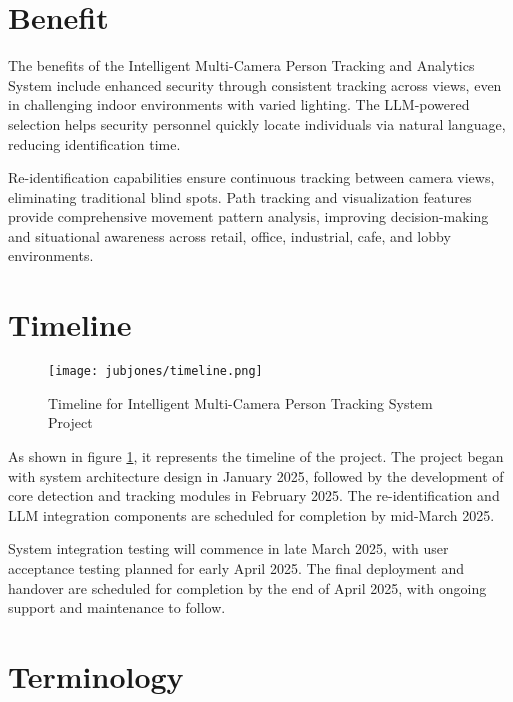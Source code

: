 \newpage

\section{Benefit}
\label{section:benefit}

The benefits of the Intelligent Multi-Camera Person Tracking and Analytics System include enhanced security through consistent tracking across views, even in challenging indoor environments with varied lighting. The LLM-powered selection helps security personnel quickly locate individuals via natural language, reducing identification time.

Re-identification capabilities ensure continuous tracking between camera views, eliminating traditional blind spots. Path tracking and visualization features provide comprehensive movement pattern analysis, improving decision-making and situational awareness across retail, office, industrial, cafe, and lobby environments.

\section{Timeline}
\label{section:timeline}

\begin{figure}[!htb]
    \centering
    \texttt{[image: jubjones/timeline.png]}
    \caption{Timeline for Intelligent Multi-Camera Person Tracking System Project}
    \label{fig:timeline}
\end{figure}

As shown in figure \ref{fig:timeline}, it represents the timeline of the project.
The project began with system architecture design in January 2025, followed by the development of core detection
and tracking modules in February 2025. The re-identification and LLM integration components are scheduled for
completion by mid-March 2025.

System integration testing will commence in late March 2025, with user acceptance testing planned for early April 2025.
The final deployment and handover are scheduled for completion by the end of April 2025, with ongoing support
and maintenance to follow.

\section{Terminology}
\label{section:terminology}

